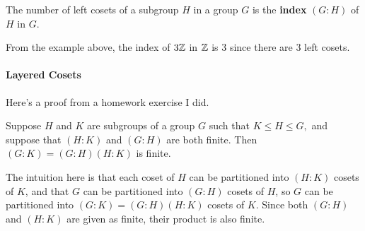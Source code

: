 \documentclass{article}
\begin{document}
\begin{definition}[index]
The number of left \@{cosets} of a \@{subgroup} $H$ in a \@{group} $G$ is the \textbf{index}  $(G:H)$ of $H$ in $G$.
\end{definition}

From the example above, the \@{index} of $3\mathbb{Z}$ in $\mathbb{Z}$ is $3$ since there are 3 left \@{cosets}.

\paragraph{Layered Cosets}

Here's a proof from a homework exercise I did.

\begin{theorem}\label{lagrange-theorem-for-indices}
Suppose $H$ and $K$ are \@{subgroups} of a \@{group} $G$ such that $K \leq H \leq G,$ and suppose that $(H : K)$ and $(G : H)$ are both finite. Then $(G : K) = (G: H)(H :K)$ is finite.
\end{theorem}

\begin{intuition}
The intuition here is that each \@{coset} of $H$ can be partitioned into $(H:K)$ cosets of $K$, and that $G$ can be partitioned into $(G:H)$ cosets of $H$, so $G$ can be partitioned into $(G:K) = (G:H)(H:K)$ cosets of $K$. Since both $(G:H)$ and $(H:K)$ are given as finite, their product is also finite.
\end{intuition}
\end{document}
